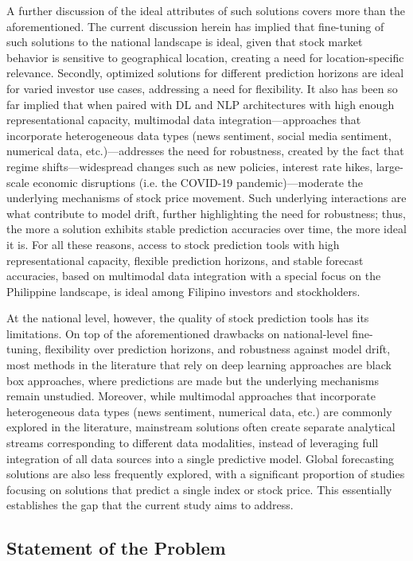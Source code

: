 \documentclass[stu,floatsintext]{apa7}
\begin{document}
A further discussion of the ideal attributes of such solutions covers more than the aforementioned. The current discussion herein has implied that fine-tuning of such solutions to the national landscape is ideal, given that stock market behavior is sensitive to geographical location, creating a need for location-specific relevance. Secondly, optimized solutions for different prediction horizons are ideal for varied investor use cases, addressing a need for flexibility. It also has been so far implied that when paired with DL and NLP architectures with high enough representational capacity, multimodal data integration—approaches that incorporate heterogeneous data types (news sentiment, social media sentiment, numerical data, etc.)—addresses the need for robustness, created by the fact that regime shifts—widespread changes such as new policies, interest rate hikes, large-scale economic disruptions (i.e. the COVID-19 pandemic)—moderate the underlying mechanisms of stock price movement. Such underlying interactions are what contribute to model drift, further highlighting the need for robustness; thus, the more a solution exhibits stable prediction accuracies over time, the more ideal it is. For all these reasons, access to stock prediction tools with high representational capacity, flexible prediction horizons, and stable forecast accuracies, based on multimodal data integration with a special focus on the Philippine landscape, is ideal among Filipino investors and stockholders.

At the national level, however, the quality of stock prediction tools has its limitations. On top of the aforementioned drawbacks on national-level fine-tuning, flexibility over prediction horizons, and robustness against model drift, most methods in the literature that rely on deep learning approaches are black box approaches, where predictions are made but the underlying mechanisms remain unstudied. Moreover, while multimodal approaches that incorporate heterogeneous data types (news sentiment, numerical data, etc.) are commonly explored in the literature, mainstream solutions often create separate analytical streams corresponding to different data modalities, instead of leveraging full integration of all data sources into a single predictive model. Global forecasting solutions are also less frequently explored, with a significant proportion of studies focusing on solutions that predict a single index or stock price. This essentially establishes the gap that the current study aims to address.

\subsection{Statement of the Problem}
\end{document}

